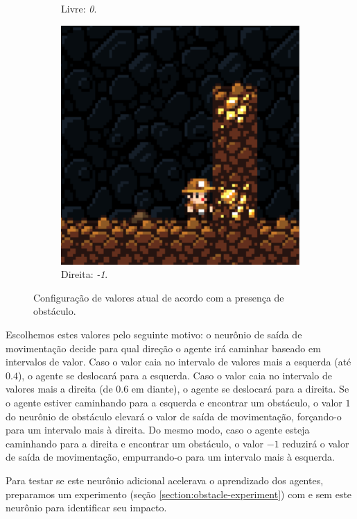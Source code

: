 \begin{figure}[H]
\begin{subfigure}[b]{0.2\textwidth}
        \caption{Livre: \textit{0}.}
	\end{subfigure}
	\begin{subfigure}[b]{0.2\textwidth}
        \includegraphics[width=\textwidth]{fig/obstacle.pdf}
        \caption{Direita: \textit{-1}.}
	\end{subfigure}
    \caption{Configuração de valores atual de acordo com a presença de
	obstáculo.}
	\label{fig:obstacle-input-correct}
\end{figure}

Escolhemos estes valores pelo seguinte motivo: o neurônio de saída de
movimentação decide para qual direção o agente irá caminhar baseado em
intervalos de valor. Caso o valor caia no intervalo de valores mais a esquerda
(até $0.4$), o agente se deslocará para a esquerda. Caso o valor caia no
intervalo de valores mais a direita (de $0.6$ em diante), o agente se deslocará
para a direita. Se o agente estiver caminhando para a esquerda e encontrar um
obstáculo, o valor $1$ do neurônio de obstáculo elevará o valor de saída de
movimentação, forçando-o para um intervalo mais à direita. Do mesmo modo, caso o
agente esteja caminhando para a direita e encontrar um obstáculo, o valor $-1$
reduzirá o valor de saída de movimentação, empurrando-o para um intervalo mais à
esquerda.

Para testar se este neurônio adicional acelerava o aprendizado dos agentes,
preparamos um experimento (seção \ref{section:obstacle-experiment}) com e sem
este neurônio para identificar seu impacto.

